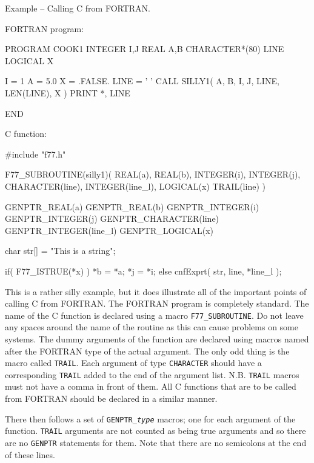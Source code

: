 \documentclass[twoside,11pt,nolof]{starlink}
\newcounter{examples}
\begin{document}
\begin{samepage}
\label{cook_argsf2c}
\begin{center}
Example\latex{~\ref{cook_argsf2c}}
-- Calling C from FORTRAN\@.
\end{center}
FORTRAN program:
\begin{small}
\begin{terminalv}
      PROGRAM COOK1
      INTEGER I,J
      REAL A,B
      CHARACTER*(80) LINE
      LOGICAL X

      I = 1
      A = 5.0
      X = .FALSE.
      LINE = ' '
      CALL SILLY1( A, B, I, J, LINE, LEN(LINE), X )
      PRINT *, LINE

      END
\end{terminalv}
\end{small}
\end{samepage}
C function:
\nopagebreak[4]
\begin{small}
\begin{terminalv}
#include "f77.h"

F77_SUBROUTINE(silly1)( REAL(a), REAL(b), INTEGER(i), INTEGER(j),
  CHARACTER(line), INTEGER(line_l), LOGICAL(x) TRAIL(line) )
{
  GENPTR_REAL(a)
  GENPTR_REAL(b)
  GENPTR_INTEGER(i)
  GENPTR_INTEGER(j)
  GENPTR_CHARACTER(line)
  GENPTR_INTEGER(line_l)
  GENPTR_LOGICAL(x)

  char str[] = "This is a string";

  if( F77_ISTRUE(*x) )
  {
     *b = *a;
     *j = *i;
  }
  else
  {
     cnfExprt( str, line, *line_l );
  }
}
\end{terminalv}
\end{small}

This is a rather silly example, but it does illustrate all of the important
points of calling C from FORTRAN\@. The FORTRAN program is completely standard.
The name of the C function is declared using a macro \texttt{F77\_\-SUBROUTINE}.
Do not leave any spaces around the name of the routine as this can cause
problems on some systems.
The dummy arguments of the function are declared using macros
named after the FORTRAN type of the actual argument. The only odd thing is the
macro called \texttt{TRAIL}.
Each argument of type \texttt{CHARACTER} should have a corresponding
\texttt{TRAIL} added to the end of the argument list. N.B. \texttt{TRAIL}
macros must not have a comma in front of them.
All C functions that are to be called from FORTRAN should be declared in a
similar manner.

There then follows a set of \texttt{GENPTR\_\-\textit{type}}\/ macros; one
for each argument of the function. \texttt{TRAIL} arguments are not counted as
being true arguments and so there are no \texttt{GENPTR} statements for them.
Note that there are no semicolons at the end of these lines.
\end{document}

